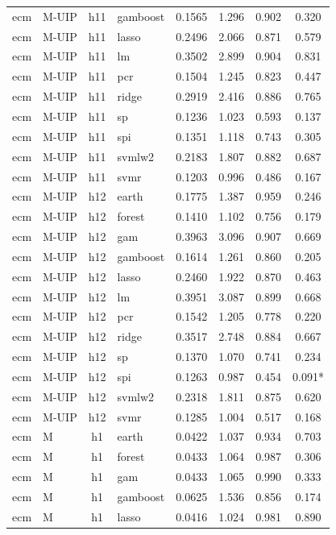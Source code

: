 \begin{ThreePartTable}
\begin{longtable}[t]{llclcccc}
ecm & M-UIP & h11 & gamboost & 0.1565 & 1.296 & 0.902 & 0.320\\
ecm & M-UIP & h11 & lasso & 0.2496 & 2.066 & 0.871 & 0.579\\
ecm & M-UIP & h11 & lm & 0.3502 & 2.899 & 0.904 & 0.831\\
ecm & M-UIP & h11 & pcr & 0.1504 & 1.245 & 0.823 & 0.447\\
ecm & M-UIP & h11 & ridge & 0.2919 & 2.416 & 0.886 & 0.765\\
ecm & M-UIP & h11 & sp & 0.1236 & 1.023 & 0.593 & 0.137\\
ecm & M-UIP & h11 & spi & 0.1351 & 1.118 & 0.743 & 0.305\\
ecm & M-UIP & h11 & svmlw2 & 0.2183 & 1.807 & 0.882 & 0.687\\
ecm & M-UIP & h11 & svmr & 0.1203 & 0.996 & 0.486 & 0.167\\
\addlinespace
ecm & M-UIP & h12 & earth & 0.1775 & 1.387 & 0.959 & 0.246\\
ecm & M-UIP & h12 & forest & 0.1410 & 1.102 & 0.756 & 0.179\\
ecm & M-UIP & h12 & gam & 0.3963 & 3.096 & 0.907 & 0.669\\
ecm & M-UIP & h12 & gamboost & 0.1614 & 1.261 & 0.860 & 0.205\\
ecm & M-UIP & h12 & lasso & 0.2460 & 1.922 & 0.870 & 0.463\\
ecm & M-UIP & h12 & lm & 0.3951 & 3.087 & 0.899 & 0.668\\
ecm & M-UIP & h12 & pcr & 0.1542 & 1.205 & 0.778 & 0.220\\
ecm & M-UIP & h12 & ridge & 0.3517 & 2.748 & 0.884 & 0.667\\
ecm & M-UIP & h12 & sp & 0.1370 & 1.070 & 0.741 & 0.234\\
ecm & M-UIP & h12 & spi & 0.1263 & 0.987 & 0.454 & 0.091*\\
ecm & M-UIP & h12 & svmlw2 & 0.2318 & 1.811 & 0.875 & 0.620\\
ecm & M-UIP & h12 & svmr & 0.1285 & 1.004 & 0.517 & 0.168\\
\addlinespace
ecm & M & h1 & earth & 0.0422 & 1.037 & 0.934 & 0.703\\
ecm & M & h1 & forest & 0.0433 & 1.064 & 0.987 & 0.306\\
ecm & M & h1 & gam & 0.0433 & 1.065 & 0.990 & 0.333\\
ecm & M & h1 & gamboost & 0.0625 & 1.536 & 0.856 & 0.174\\
ecm & M & h1 & lasso & 0.0416 & 1.024 & 0.981 & 0.890\\

\end{longtable}
\end{ThreePartTable}

